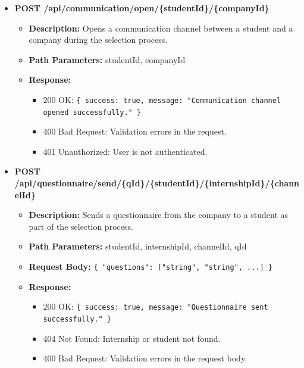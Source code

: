 \begin{itemize}
    \item \textbf{POST /api/communication/open/\{studentId\}/\{companyId\}}  
    \begin{itemize}
        \item \textbf{Description:} Opens a communication channel between a student and a company during the selection process.
        \item \textbf{Path Parameters:} studentId, companyId  
        \item \textbf{Response:}
        \begin{itemize}
            \item 200 OK: \texttt{\{ success: true, message: "Communication channel opened successfully." \}}
            \item 400 Bad Request: Validation errors in the request.
            \item 401 Unauthorized: User is not authenticated.
        \end{itemize}
    \end{itemize}


    \item \textbf{POST /api/questionnaire/send/\{qId\}/\{studentId\}/\{internshipId\}/\{channelId\}}  
    \begin{itemize}
        \item \textbf{Description:} Sends a questionnaire from the company to a student as part of the selection process.
        \item \textbf{Path Parameters:} studentId, internshipId, channelId, qId  
        \item \textbf{Request Body:} 
        \texttt{\{ 
            "questions": ["string", "string", ...]
        \}}
        \item \textbf{Response:}
        \begin{itemize}
            \item 200 OK: \texttt{\{ success: true, message: "Questionnaire sent successfully." \}}
            \item 404 Not Found: Internship or student not found.
            \item 400 Bad Request: Validation errors in the request body.
        \end{itemize}
    \end{itemize}


\end{itemize}
